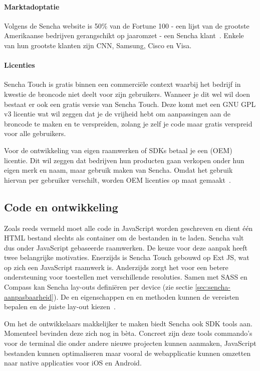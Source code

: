 \paragraph{Marktadoptatie}
Volgens de Sencha website is 50\% van de Fortune 100 - een lijst van de grootste Amerikaanse bedrijven gerangschikt op jaaromzet - een Sencha klant~\cite{Inc.}.  
Enkele van hun grootste klanten zijn CNN,  Samsung,  Cisco en  Visa.

\paragraph{Licenties}
Sencha Touch is gratis binnen een commerciële context waarbij het bedrijf in kwestie de broncode niet deelt voor zijn gebruikers.  
Wanneer je dit wel wil doen bestaat er ook een gratis  versie van Sencha Touch.  
Deze komt met een GNU GPL v3  licentie wat wil zeggen dat je de vrijheid hebt om aanpassingen aan de broncode te maken en te verspreiden,  zolang je zelf je code maar gratis verspreid voor alle gebruikers.
  
Voor de ontwikkeling van eigen raamwerken of SDKs betaal je een  (OEM) licentie.  
Dit wil zeggen dat bedrijven hun producten gaan verkopen onder hun eigen merk en naam, maar gebruik maken van Sencha.  
Omdat het gebruik hiervan per gebruiker verschilt,  worden OEM licenties op maat gemaakt~\cite{Inc.}.

\subsection{Code en ontwikkeling}
Zoals reeds vermeld moet alle code in JavaScript worden geschreven en dient één HTML bestand slechts als container om de bestanden in te laden.  Sencha valt dus onder JavaScript gebaseerde raamwerken.  
De keuze voor deze aanpak heeft twee belangrijke motivaties.  
Enerzijds is Sencha Touch gebouwd op Ext JS,  wat op zich een JavaScript raamwerk is.  
Anderzijds zorgt het voor een betere ondersteuning voor toestellen met verschillende resoluties.  
Samen met SASS en Compass kan Sencha lay-outs definiëren per device (zie sectie \ref{sec:sencha-aanpasbaarheid}).  
De  en  eigenschappen en  en  methoden kunnen de vereisten bepalen en de juiste lay-out kiezen~\cite{JohnEClark2012}.

Om het de ontwikkelaars makkelijker te maken biedt Sencha ook SDK tools aan.  
Momenteel bevinden deze zich nog in bèta.  
Concreet zijn deze tools commando's voor de terminal die onder andere nieuwe projecten kunnen aanmaken, JavaScript bestanden kunnen optimaliseren maar vooral de webapplicatie kunnen omzetten naar native applicaties voor iOS en Android.


